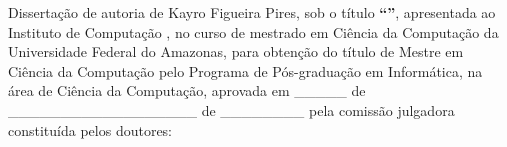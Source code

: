 \documentclass[
	12pt,				%
	oneside,			%
	a4paper,			%
	english,			%
	brazil				%
	]{abntex2ppgsi}
\begin{document}

\begin{folhadeaprovacao}
%
%
%
%
\noindent Dissertação de autoria de Kayro Figueira Pires, sob o título \textbf{``\imprimirtitulo''}, apresentada ao Instituto de Computação , no curso de mestrado em Ciência da Computação da Universidade Federal do Amazonas, para obtenção do título de Mestre em Ciência da Computação pelo Programa de Pós-graduação em Informática, na área de Ciência da Computação, aprovada em \_\_\_\_\_ de \_\_\_\_\_\_\_\_\_\_\_\_\_\_\_\_\_\_ de \_\_\_\_\_\_\_\_ pela comissão julgadora constituída pelos doutores:

\vspace*{3cm}


\end{folhadeaprovacao}
\end{document}
